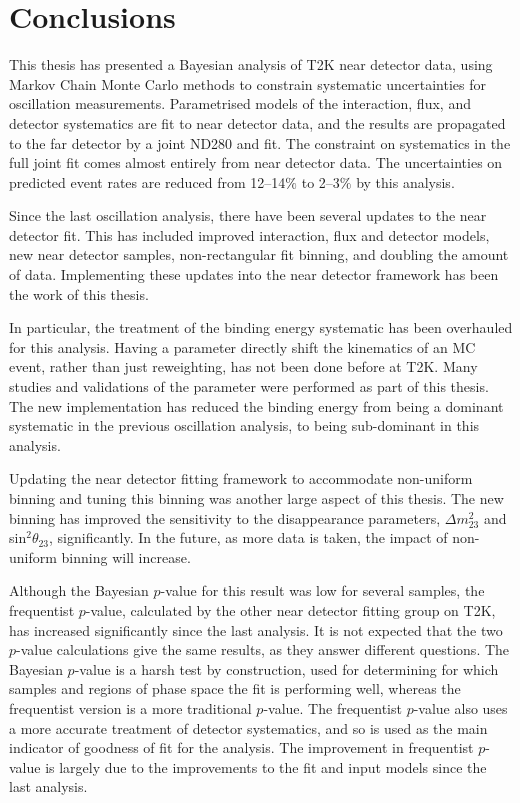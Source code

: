 \chapter{Conclusions}

This thesis has presented a Bayesian analysis of T2K near detector data, using Markov Chain Monte Carlo methods to constrain systematic uncertainties for oscillation measurements. Parametrised models of the interaction, flux, and detector systematics are fit to near detector data, and the results are propagated to the far detector by a joint ND280 and \SK fit. The constraint on systematics in the full joint fit comes almost entirely from near detector data. The uncertainties on predicted \SK event rates are reduced from 12--14$\%$ to 2--3$\%$ by this analysis. 

Since the last oscillation analysis, there have been several updates to the near detector fit. This has included improved interaction, flux and detector models, new near detector samples, non-rectangular fit binning, and doubling the amount of data. Implementing these updates into the near detector framework has been the work of this thesis.

In particular, the treatment of the binding energy systematic has been overhauled for this analysis. Having a parameter directly shift the kinematics of an MC event, rather than just reweighting, has not been done before at T2K. Many studies and validations of the parameter were performed as part of this thesis. The new implementation has reduced the binding energy from being a dominant systematic in the previous oscillation analysis, to being sub-dominant in this analysis.

Updating the near detector fitting framework to accommodate non-uniform binning and tuning this binning was another large aspect of this thesis. The new binning has improved the sensitivity to the disappearance parameters, $\Delta m^{2}_{23}$ and sin$^2 \theta_{23}$, significantly. In the future, as more data is taken, the impact of non-uniform binning will increase.

Although the Bayesian $p$-value for this result was low for several samples, the frequentist $p$-value, calculated by the other near detector fitting group on T2K, has increased significantly since the last analysis. It is not expected that the two $p$-value calculations give the same results, as they answer different questions. The Bayesian $p$-value is a harsh test by construction, used for determining for which samples and regions of phase space the fit is performing well, whereas the frequentist version is a more traditional $p$-value. The frequentist $p$-value also uses a more accurate treatment of detector systematics, and so is used as the main indicator of goodness of fit for the analysis. The improvement in frequentist $p$-value is largely due to the improvements to the fit and input models since the last analysis.

